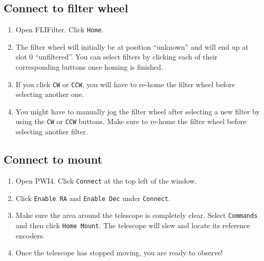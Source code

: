 \documentclass{article}
\begin{document}
	\subsection{Connect to filter wheel}
	\label{sec:connect-to-filter-wheel}
	
	\begin{enumerate}
		
		\item Open FLIFilter. Click \texttt{Home}.
		
		\item The filter wheel will initially be at position ``unknown'' and will end up at slot 0 ``unfiltered''. You can select filters by clicking each of their corresponding buttons once homing is finished.
		
		\item If you click \texttt{CW} or \texttt{CCW}, you will have to re-home the filter wheel before selecting another one.
		
		\item You might have to manually jog the filter wheel after selecting a new filter by using the \texttt{CW} or \texttt{CCW} buttons. Make sure to re-home the filter wheel before selecting another filter.
		
	\end{enumerate}
	
	\subsection{Connect to mount}
	\label{sec:connect-to-mount}
	
	\begin{enumerate}
		
		\item Open PWI4. Click \texttt{Connect} at the top left of the window.
		
		\item Click \texttt{Enable RA} and \texttt{Enable Dec} under \texttt{Connect}.
		
		\item Make sure the area around the telescope is completely clear. Select \texttt{Commands} and then click \texttt{Home Mount}. The telescope will slew and locate its reference encoders.
		
		\item Once the telescope has stopped moving, you are ready to observe!
		
	\end{enumerate}
	
\end{document}
